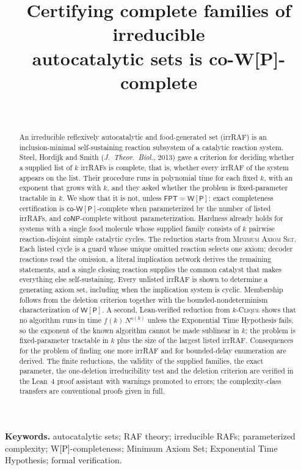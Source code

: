\documentclass[11pt,a4paper]{article}
\title{Certifying complete families of irreducible\\ autocatalytic sets is co-W[P]-complete}
\author{\PaperAuthor\\ \PaperAffiliation}
\date{\PaperDate}
\theoremstyle{plain}
\theoremstyle{definition}
\theoremstyle{remark}
\newcommand{\MAS}{\textup{\textsc{Minimum Axiom Set}}}
\newcommand{\Clique}{\textup{\textsc{Clique}}}
\newcommand{\coNP}{\mathsf{coNP}}
\newcommand{\FPT}{\mathsf{FPT}}
\newcommand{\WP}{\mathsf{W[P]}}
\newcommand{\coWP}{\mathsf{co\text{-}W[P]}}
\newcommand{\Nlen}{N}
\begin{document}
\maketitle

\begin{abstract}
An irreducible reflexively autocatalytic and food-generated set (irrRAF) is an inclusion-minimal self-sustaining reaction subsystem of a catalytic reaction system. Steel, Hordijk and Smith (\emph{J.\ Theor.\ Biol.}, 2013) gave a criterion for deciding whether a supplied list of $k$ irrRAFs is complete, that is, whether every irrRAF of the system appears on the list. Their procedure runs in polynomial time for each fixed $k$, with an exponent that grows with $k$, and they asked whether the problem is fixed-parameter tractable in $k$. We show that it is not, unless $\FPT=\WP$: exact completeness certification is $\coWP$-complete when parameterized by the number of listed irrRAFs, and $\coNP$-complete without parameterization. Hardness already holds for systems with a single food molecule whose supplied family consists of $k$ pairwise reaction-disjoint simple catalytic cycles. The reduction starts from \MAS. Each listed cycle is a guard whose unique omitted reaction selects one axiom; decoder reactions read the omission, a literal implication network derives the remaining statements, and a single closing reaction supplies the common catalyst that makes everything else self-sustaining. Every unlisted irrRAF is shown to determine a generating axiom set, including when the implication system is cyclic. Membership follows from the deletion criterion together with the bounded-nondeterminism characterization of $\WP$. A second, Lean-verified reduction from $k$-\Clique{} shows that no algorithm runs in time $f(k)\,\Nlen^{o(k)}$ unless the Exponential Time Hypothesis fails, so the exponent of the known algorithm cannot be made sublinear in $k$; the problem is fixed-parameter tractable in $k$ plus the size of the largest listed irrRAF. Consequences for the problem of finding one more irrRAF and for bounded-delay enumeration are derived. The finite reductions, the validity of the supplied families, the exact parameter, the one-deletion irreducibility test and the deletion criterion are verified in the Lean~4 proof assistant with warnings promoted to errors; the complexity-class transfers are conventional proofs given in full.
\end{abstract}

\noindent\textbf{Keywords.} autocatalytic sets; RAF theory; irreducible RAFs; parameterized complexity; W[P]-completeness; Minimum Axiom Set; Exponential Time Hypothesis; formal verification.
\end{document}
